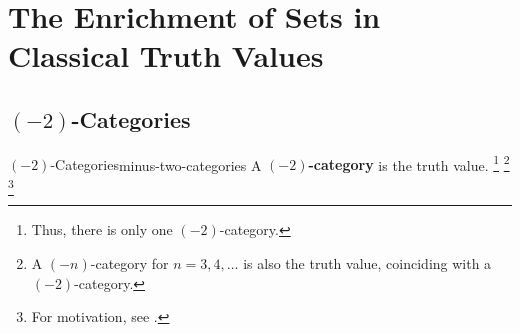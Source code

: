 \section{The Enrichment of Sets in Classical Truth Values}\label{section-the-enrichment-of-sets-in-classical-truth-values}
\subsection{\texorpdfstring{$(-2)$}{(-2)}-Categories}\label{subsection-minus-two-categories}
\begin{definition}{$(-2)$-Categories}{minus-two-categories}%
    A \textbf{$(-2)$-category} is the  truth value.%
    \footnote{%
        Thus, there is only one $(-2)$-category.
    }%
    \footnote{%
        A $(-n)$-category for $n=3,4,\ldots$ is also the  truth value, coinciding with a $(-2)$-category.
    }%
    \footnote{%
        For motivation, see \cite[p.~13]{lectures-on-n-categories-and-cohomology}.
        \par\vspace*{\TCBBoxCorrection}
    }%
\end{definition}
